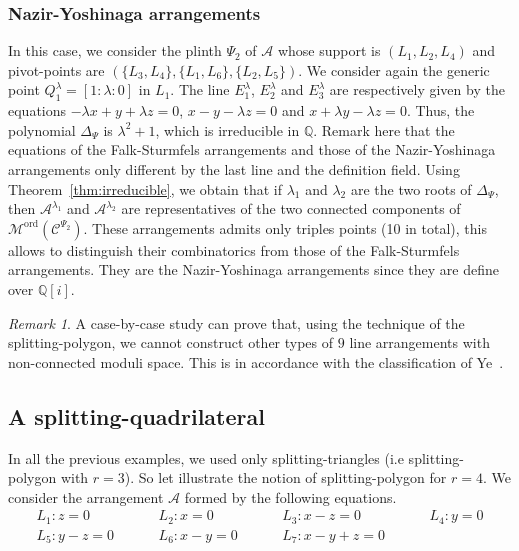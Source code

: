\documentclass[11pt, a4paper]{amsart}
\theoremstyle{definition}
\theoremstyle{remark}
\newtheorem{rmk}[theorem]{Remark}
\newcommand{\QQ}{\mathds{Q}}
\newcommand{\A}{\mathcal{A}}
\newcommand{\C}{\mathcal{C}}
\newcommand{\M}{\mathcal{M}}
\newcommand{\ord}{\text{ord}}
\begin{document}
\subsubsection{Nazir-Yoshinaga arrangements}
In this case, we consider the plinth $\Psi_2$ of $\A$ whose support is $(L_1,L_2,L_4)$ and pivot-points are $(\{L_3,L_4\},\{L_1,L_6\},\{L_2,L_5\})$. We consider again the generic point $Q_1^\lambda=[1:\lambda:0]$ in $L_1$. The line $E^\lambda_1$, $E^\lambda_2$ and $E^\lambda_3$ are respectively given by the equations  $ -\lambda x + y + \lambda z=0$, $x - y - \lambda z =0$ and $x + \lambda y - \lambda z = 0$. Thus, the polynomial $\Delta_\Psi$ is $\lambda^2+1$, which is irreducible in $\QQ$. Remark here that the equations of the Falk-Sturmfels arrangements and those of the Nazir-Yoshinaga arrangements only different by the last line and the definition field. Using Theorem~\ref{thm:irreducible}, we obtain that if $\lambda_1$ and $\lambda_2$ are the two roots of $\Delta_{\Psi}$, then $\A^{\lambda_1}$ and $\A^{\lambda_2}$ are representatives of the two connected components of $\M^\ord(\C^{\Psi_2})$. These arrangements admits only triples points (10 in total), this allows to distinguish their combinatorics from those of the Falk-Sturmfels arrangements. They are the Nazir-Yoshinaga arrangements since they are define over $\QQ[i]$.

\begin{rmk}
	A case-by-case study can prove that, using the technique of the splitting-polygon, we cannot construct other types of $9$ line arrangements with non-connected moduli space. This is in accordance with the classification of Ye~\cite{Ye}.
\end{rmk}



\subsection{A splitting-quadrilateral}\mbox{}

In all the previous examples, we used only splitting-triangles (i.e splitting-polygon with $r=3$). So let illustrate the notion of splitting-polygon for $r=4$. We consider the arrangement $\A$ formed by the following equations.
\begin{equation*}
	\begin{array}{llll}
	L_1: z=0 \hspace{1cm} 
	& L_2: x=0 \hspace{1cm}
	& L_3: x-z=0\hspace{1cm}
	& L_4: y=0 \\
	L_5: y-z=0 \hspace{1cm}
	& L_6: x-y=0 \hspace{1cm}
	& L_7: x-y+z=0 \hspace{1cm}
	&
	\end{array}
\end{equation*}
\end{document}
